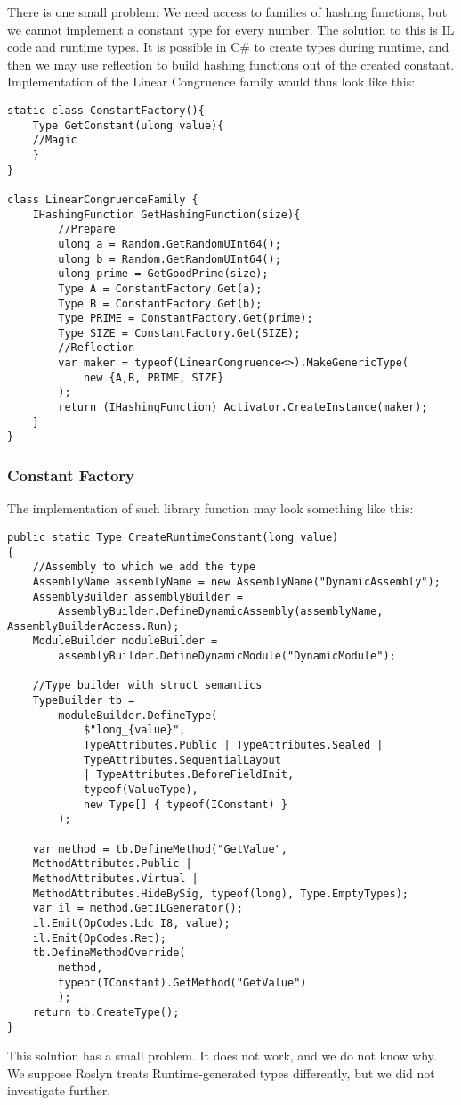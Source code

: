 There is one small problem: We need access to families of hashing functions, but we cannot implement a constant type for every number. The solution to this is IL code and runtime types. It is possible in C\# to create types during runtime, and then we may use reflection to build hashing functions out of the created constant. Implementation of the Linear Congruence family would thus look like this:

\begin{lstlisting}
static class ConstantFactory(){
    Type GetConstant(ulong value){
    //Magic
    }
}

class LinearCongruenceFamily {
    IHashingFunction GetHashingFunction(size){
        //Prepare
        ulong a = Random.GetRandomUInt64();
        ulong b = Random.GetRandomUInt64();
        ulong prime = GetGoodPrime(size);
        Type A = ConstantFactory.Get(a);
        Type B = ConstantFactory.Get(b);
        Type PRIME = ConstantFactory.Get(prime);
        Type SIZE = ConstantFactory.Get(SIZE);
        //Reflection
        var maker = typeof(LinearCongruence<>).MakeGenericType(
            new {A,B, PRIME, SIZE}
        );
        return (IHashingFunction) Activator.CreateInstance(maker);
    }
}
\end{lstlisting}


\subsubsection{Constant Factory}
The implementation of such library function may look something like this:
\begin{lstlisting}
public static Type CreateRuntimeConstant(long value)
{
    //Assembly to which we add the type
    AssemblyName assemblyName = new AssemblyName("DynamicAssembly");
    AssemblyBuilder assemblyBuilder =
        AssemblyBuilder.DefineDynamicAssembly(assemblyName, AssemblyBuilderAccess.Run);
    ModuleBuilder moduleBuilder =
        assemblyBuilder.DefineDynamicModule("DynamicModule");

    //Type builder with struct semantics
    TypeBuilder tb = 
        moduleBuilder.DefineType(
            $"long_{value}",
            TypeAttributes.Public | TypeAttributes.Sealed | 
            TypeAttributes.SequentialLayout 
            | TypeAttributes.BeforeFieldInit,
            typeof(ValueType),
            new Type[] { typeof(IConstant) }
        );
    
    var method = tb.DefineMethod("GetValue", 
    MethodAttributes.Public | 
    MethodAttributes.Virtual | 
    MethodAttributes.HideBySig, typeof(long), Type.EmptyTypes);
    var il = method.GetILGenerator();
    il.Emit(OpCodes.Ldc_I8, value);
    il.Emit(OpCodes.Ret);
    tb.DefineMethodOverride(
        method,
        typeof(IConstant).GetMethod("GetValue")
        );
    return tb.CreateType();
} 
\end{lstlisting}
This solution has a small problem. It does not work, and we do not know why. We suppose Roslyn treats Runtime-generated types differently, but we did not investigate further.



